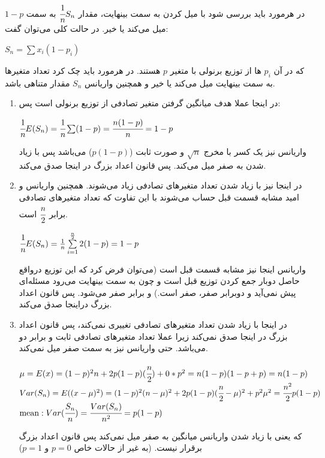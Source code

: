 \documentclass[12pt]{article}
\begin{document}
در هرمورد باید بررسی شود با میل کردن 
به سمت بینهایت، مقدار 
$\cfrac{1}{n}S_n$
به سمت 
$1 - p$
میل می‌کند یا خیر.
در حالت کلی می‌توان گفت:
\begin{latin}
	$
	S_n = \sum x_i (1 - p_i)
	$
\end{latin}
که در آن $p_i$ ها از توزیع برنولی با متغیر $p$ هستند. در هرمورد باید چک کرد تعداد متغیرها به سمت بینهایت میل می‌کند یا خیر و همچنین واریانس $S_n$ مقدار متناهی باشد.
\begin{enumerate}



 	\item 
 	در اینجا عملا هدف میانگین گرفتن  متغیر تصادفی از توزیع برنولی است پس:
 	\begin{latin}
 		$
 		\cfrac{1}{n}	E(S_n) = \cfrac{1}{n} \sum (1 - p) = \cfrac{n(1 - p)}{n} = 1 - p
 		$
 	\end{latin}
 	واریانس نیز یک کسر با مخرج 
 	$\sqrt{n}$
 	و صورت ثابت 
 	($p(1 - p)$)
 	می‌باشد پس با زیاد شدن  به صفر میل می‌کند. پس قانون اعداد بزرگ در اینجا صدق می‌کند.
 	\item 
 	در اینجا نیز با زیاد شدن 
 	تعداد متغیرهای تصادفی زیاد می‌شوند. همچنین واریانس و امید مشابه قسمت قبل حساب می‌شوند با این تفاوت که تعداد متغیرهای تصادفی برابر 
 	$
 	\cfrac{n}{2}
 	$
 	است.
 	
\begin{latin}
	$
	\cfrac{1}{n}	E(S_n) = \frac{1}{n} \sum\limits_{i = 1}^{\frac{n}{2}} 2(1 - p)  = 1 - p
	$
\end{latin}
واریانس اینجا نیز مشابه قسمت قبل است (می‌توان فرض کرد که این توزیع درواقع حاصل دوبار جمع کردن توزیع قبل است و چون 
به سمت بینهایت می‌رود مسئله‌ای پیش نمی‌آید و دوبرابر صفر، صفر است.) و برابر صفر می‌شود. پس قانون اعداد بزرگ دراینجا صدق می‌کند.
\item 
در اینجا با زیاد شدن  تعداد متغیرهای تصادفی تغییری نمی‌کند، پس قانون اعداد بزرگ در اینجا صدق نمی‌کند زیرا عملا تعداد متغیرهای تصادفی ثابت و برابر دو می‌باشد. حتی واریانس نیز به سمت صفر میل نمی‌کند. 
\begin{latin}
	$
	\mu = E(x) = (1 - p)^2 n + 2p(1 - p)(\cfrac{n}{2})  + 0 * p^2= n(1 - p)(1 - p + p) = n(1 - p)
	$
	\\
	$
	Var(S_n) = E((x - \mu)^2) = (1 - p)^2 (n - \mu)^2 + 2p(1 - p)(\cfrac{n}{2} - \mu)^2 + p^2 \mu^2 = \cfrac{n^2}{2}p(1 - p)
	$
	\\
	$
	\text{mean}: Var(\cfrac{S_n}{n}) = \cfrac{Var(S_n)}{n^2} = p(1 - p) 
	$
\end{latin} 
که یعنی با زیاد شدن  واریانس میانگین به صفر میل نمی‌کند پس قانون اعداد بزرگ برقرار نیست.  (به غیر از حالات خاص $p = 0$ و $p = 1$)


\end{enumerate}
\end{document}
